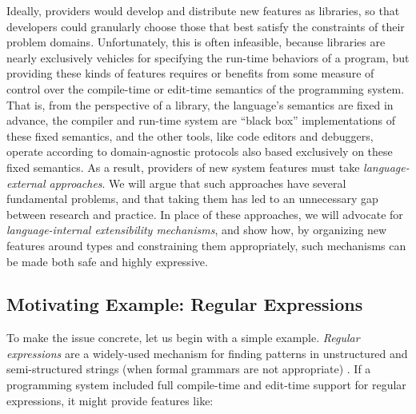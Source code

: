 Ideally, providers would develop and distribute new features as libraries, so that developers could granularly choose those that best satisfy the constraints of their problem domains. Unfortunately, this is often infeasible, because libraries are nearly exclusively vehicles for specifying the run-time behaviors of a program, but providing these kinds of features  requires or benefits from some measure of control over the compile-time or edit-time semantics of the programming system. That is, from the perspective of a library, the language's semantics are fixed in advance, the compiler and run-time system are ``black box'' implementations of these fixed semantics, and the other tools, like code editors and debuggers, operate according to domain-agnostic protocols also based exclusively on these fixed semantics. As a result, providers of new system features must take \emph{language-external approaches}. We will argue that such approaches have several fundamental problems, and that taking them has led to an unnecessary gap between research and practice. In place of these approaches, we will advocate for \emph{language-internal extensibility mechanisms}, and show how, by organizing new features around types and constraining them appropriately, such mechanisms can be made both safe and highly expressive.

\subsection{Motivating Example: Regular Expressions}\label{regex}
To make the issue concrete, let us begin with a simple example. \emph{Regular expressions} are a widely-used mechanism for finding patterns in unstructured and semi-structured strings (when formal grammars are not appropriate) \cite{regex}. If a programming system included full compile-time and edit-time support for regular expressions, it might provide features like:

